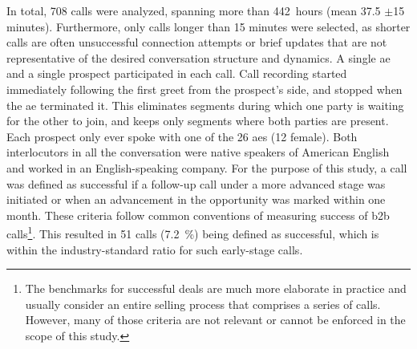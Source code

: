 In total, 708 calls were analyzed, spanning more than \SI{442}{hours} (mean 37.5 $\pm$15 minutes).
Furthermore, only calls longer than 15 minutes were selected, as shorter calls are often unsuccessful connection attempts or brief updates that are not representative of the desired conversation structure and dynamics.
A single \ac{ae} and a single prospect participated in each call.
Call recording started immediately following the first greet from the prospect's side, and stopped when the \ac{ae} terminated it.
This eliminates segments during which one party is waiting for the other to join, and keeps only segments where both parties are present.
Each prospect only ever spoke with one of the 26 \acp{ae} (12 female).
Both interlocutors in all the conversation were native speakers of American English and worked in an English-speaking company.
For the purpose of this study, a call was defined as successful if a follow-up call under a more advanced stage was initiated or when an advancement in the opportunity was marked within one month.
These criteria follow common conventions of measuring success of \ac{b2b} calls\footnote{The benchmarks for successful deals are much more elaborate in practice and usually consider an entire selling process that comprises a series of calls.
However, many of those criteria are not relevant or cannot be enforced in the scope of this study.}.
This resulted in 51 calls (\SI{7.2}{\percent}) being defined as successful, which is within the industry-standard ratio for such early-stage calls.

